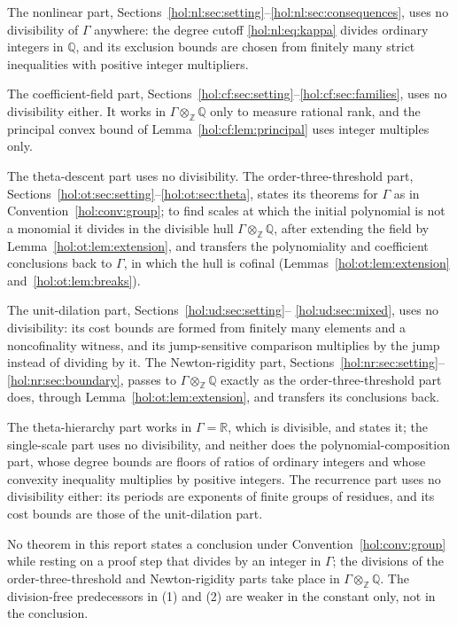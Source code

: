 \documentclass[11pt]{article}
\numberwithin{equation}{section}
\theoremstyle{definition}
\theoremstyle{remark}
\newcommand{\R}{\mathbb R}
\newcommand{\Q}{\mathbb Q}
\newcommand{\Z}{\mathbb Z}
\begin{document}
The nonlinear part,
Sections~\ref{hol:nl:sec:setting}--\ref{hol:nl:sec:consequences}, uses no
divisibility of $\Gamma$ anywhere: the degree cutoff
\eqref{hol:nl:eq:kappa} divides ordinary integers in $\Q$, and its exclusion bounds are
chosen from finitely many strict inequalities with positive integer
multipliers.

The coefficient-field part,
Sections~\ref{hol:cf:sec:setting}--\ref{hol:cf:sec:families}, uses no
divisibility either. It works in $\Gamma\otimes_\Z\Q$ only to measure rational
rank, and the principal convex bound of Lemma~\ref{hol:cf:lem:principal} uses
integer multiples only.

The theta-descent part uses no divisibility. The order-three-threshold part,
Sections~\ref{hol:ot:sec:setting}--\ref{hol:ot:sec:theta}, states its theorems
for $\Gamma$ as in Convention~\ref{hol:conv:group}; to find scales at which the
initial polynomial is not a monomial it divides in the divisible hull
$\Gamma\otimes_\Z\Q$, after extending the field by
Lemma~\ref{hol:ot:lem:extension}, and transfers the polynomiality and
coefficient conclusions back to $\Gamma$, in which the hull is cofinal
(Lemmas~\ref{hol:ot:lem:extension} and~\ref{hol:ot:lem:breaks}).

The unit-dilation part, Sections~\ref{hol:ud:sec:setting}--%
\ref{hol:ud:sec:mixed}, uses no divisibility: its cost bounds are formed from
finitely many elements and a noncofinality witness, and its jump-sensitive
comparison multiplies by the jump instead of dividing by it. The
Newton-rigidity part, Sections~\ref{hol:nr:sec:setting}--%
\ref{hol:nr:sec:boundary}, passes to $\Gamma\otimes_\Z\Q$ exactly as the
order-three-threshold part does, through Lemma~\ref{hol:ot:lem:extension}, and
transfers its conclusions back.

The theta-hierarchy part works in $\Gamma=\R$, which is divisible, and states
it; the single-scale part uses no divisibility, and neither does the
polynomial-composition part, whose degree bounds are floors of ratios of
ordinary integers and whose convexity inequality multiplies by positive
integers. The recurrence part uses no divisibility either: its periods are
exponents of finite groups of residues, and its cost bounds are those of the
unit-dilation part.

No theorem in this report states a conclusion under
Convention~\ref{hol:conv:group} while resting on a proof step that divides by
an integer in $\Gamma$; the divisions of the order-three-threshold and
Newton-rigidity parts take place in $\Gamma\otimes_\Z\Q$. The division-free predecessors in (1) and (2) are
weaker in the constant only, not in the conclusion.
\end{document}
